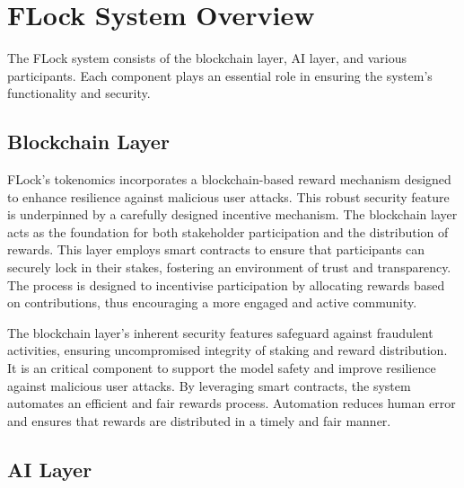 \documentclass[conference]{IEEEtran}
\begin{document}
\section{FLock System Overview}
The FLock system consists of the blockchain layer, AI layer, and various participants. Each component plays an essential role in ensuring the system's functionality and security.





\subsection{Blockchain Layer}
FLock's tokenomics incorporates a blockchain-based reward mechanism designed to enhance resilience against malicious user attacks.  This robust security feature is underpinned by a carefully designed incentive mechanism.
The blockchain layer acts as the foundation for both stakeholder participation and the distribution of rewards. This layer employs smart contracts to ensure that participants can securely lock in their stakes, fostering an environment of trust and transparency. The process is designed to incentivise participation by allocating rewards based on contributions, thus encouraging a more engaged and active community.

The blockchain layer's inherent security features safeguard against fraudulent activities, ensuring uncompromised integrity of staking and reward distribution. It is an critical component to support the model safety and improve resilience against malicious user attacks. By leveraging smart contracts, the system automates an efficient and fair rewards process. Automation reduces human error and ensures that rewards are distributed in a timely and fair manner. 

\subsection{AI Layer}


\end{document}
